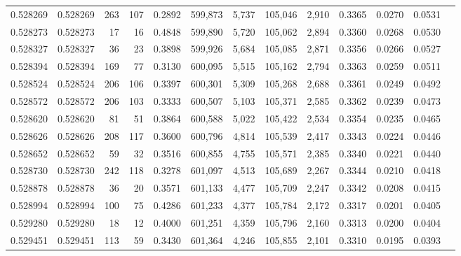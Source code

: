 \begin{tabular}{rrrrrrrrrrrrr}
0.528269 & 0.528269 &   263 &   107 &                                     0.2892 & 599,873 &   5,737 & 105,046 &   2,910 & 0.3365 & 0.0270 & 0.0531 \\
0.528273 & 0.528273 &    17 &    16 &                                     0.4848 & 599,890 &   5,720 & 105,062 &   2,894 & 0.3360 & 0.0268 & 0.0530 \\
0.528327 & 0.528327 &    36 &    23 &                                     0.3898 & 599,926 &   5,684 & 105,085 &   2,871 & 0.3356 & 0.0266 & 0.0527 \\
0.528394 & 0.528394 &   169 &    77 &                                     0.3130 & 600,095 &   5,515 & 105,162 &   2,794 & 0.3363 & 0.0259 & 0.0511 \\
0.528524 & 0.528524 &   206 &   106 &                                     0.3397 & 600,301 &   5,309 & 105,268 &   2,688 & 0.3361 & 0.0249 & 0.0492 \\
0.528572 & 0.528572 &   206 &   103 &                                     0.3333 & 600,507 &   5,103 & 105,371 &   2,585 & 0.3362 & 0.0239 & 0.0473 \\
0.528620 & 0.528620 &    81 &    51 &                                     0.3864 & 600,588 &   5,022 & 105,422 &   2,534 & 0.3354 & 0.0235 & 0.0465 \\
0.528626 & 0.528626 &   208 &   117 &                                     0.3600 & 600,796 &   4,814 & 105,539 &   2,417 & 0.3343 & 0.0224 & 0.0446 \\
0.528652 & 0.528652 &    59 &    32 &                                     0.3516 & 600,855 &   4,755 & 105,571 &   2,385 & 0.3340 & 0.0221 & 0.0440 \\
0.528730 & 0.528730 &   242 &   118 &                                     0.3278 & 601,097 &   4,513 & 105,689 &   2,267 & 0.3344 & 0.0210 & 0.0418 \\
0.528878 & 0.528878 &    36 &    20 &                                     0.3571 & 601,133 &   4,477 & 105,709 &   2,247 & 0.3342 & 0.0208 & 0.0415 \\
0.528994 & 0.528994 &   100 &    75 &                                     0.4286 & 601,233 &   4,377 & 105,784 &   2,172 & 0.3317 & 0.0201 & 0.0405 \\
0.529280 & 0.529280 &    18 &    12 &                                     0.4000 & 601,251 &   4,359 & 105,796 &   2,160 & 0.3313 & 0.0200 & 0.0404 \\
0.529451 & 0.529451 &   113 &    59 &                                     0.3430 & 601,364 &   4,246 & 105,855 &   2,101 & 0.3310 & 0.0195 & 0.0393 \\

\end{tabular}
